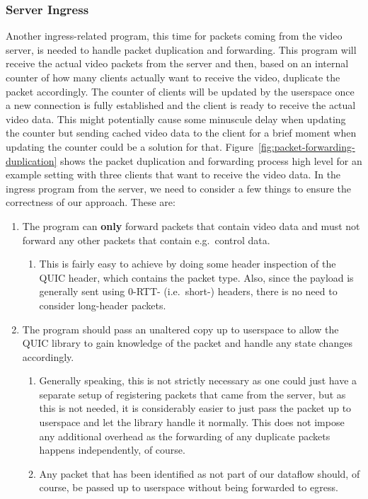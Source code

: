 \subsubsection{Server Ingress}
Another ingress-related program, this time for packets coming from the video server, is needed
to handle packet duplication and forwarding.
This program will receive the actual video packets from the server and then, based on an internal 
counter of how many clients actually want to receive the video, duplicate the packet accordingly.
The counter of clients will be updated by the userspace once a new connection is fully established
and the client is ready to receive the actual video data.
This might potentially cause some minuscule delay when updating the counter but sending cached 
video data to the client for a brief moment when updating the counter could be a solution for that. %
Figure~\ref{fig:packet-forwarding-duplication} shows the packet duplication and forwarding process 
high level for an example setting with three clients that want to receive the video data.
In the ingress program from the server, we need to consider a few things to ensure the correctness
of our approach.
These are:
\begin{enumerate}
    \item   The program can \textbf{only} forward packets that contain video data and must not 
            forward any other packets that contain e.g.~control data.
    \begin{enumerate}
        \item   This is fairly easy to achieve by doing some header inspection of the QUIC header,
                which contains the packet type. Also, since the payload is generally sent using 
                0-RTT- (i.e.~short-) headers, there is no need to consider long-header packets.
    \end{enumerate}

    \item   The program should pass an unaltered copy up to userspace to allow the QUIC library to
            gain knowledge of the packet and handle any state changes accordingly.
    \begin{enumerate}
        \item   Generally speaking, this is not strictly necessary as one could just have a separate 
                setup of registering packets that came from the server, but as this is not needed,
                it is considerably easier to just pass the packet up to userspace and let the 
                library handle it normally. This does not impose any additional overhead as the
                forwarding of any duplicate packets happens independently, of course.
        \item   Any packet that has been identified as not part of our dataflow should, of course, 
                be passed up to userspace without being forwarded to egress.
    \end{enumerate}
\end{enumerate}

